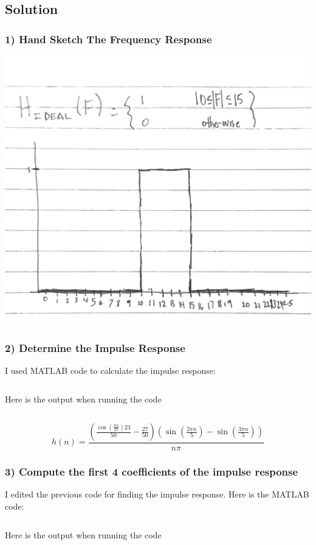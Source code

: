 \documentclass[12pt,letterpaper]{article}
\begin{document}
\subsection*{Solution}
\subsubsection*{1) Hand Sketch The Frequency Response}
\includegraphics*[scale=0.25]{p2p1.jpg}
\subsubsection*{2) Determine the Impulse Response}
I used MATLAB code to calculate the impulse response:
\inputminted[frame=lines,framesep=2mm,baselinestretch=1.2,bgcolor=LightGray,breaklines,fontsize=\tiny,linenos]{matlab}{p2p2.m}
\newpage
Here is the output when running the code
\inputminted[frame=lines,framesep=2mm,baselinestretch=1.2,bgcolor=LightGray,breaklines,fontsize=\tiny,linenos]{text}{p2p2.txt}
\[
h(n) = \frac{(\frac{\cos\left(\frac{\pi n}{25}\right) 23}{50} - \frac{27}{50}) \left(\sin\left(\frac{2 \pi n}{5}\right) - \sin\left(\frac{3 \pi n}{5}\right)\right)}{n \pi}
\]
\subsubsection*{3) Compute the first 4 coefficients of the impulse response}
I edited the previous code for finding the impulse response. Here is the MATLAB code:
\inputminted[frame=lines,framesep=2mm,baselinestretch=1.2,bgcolor=LightGray,breaklines,fontsize=\tiny,linenos]{matlab}{p2p3.m}
Here is the output when running the code
\inputminted[frame=lines,framesep=2mm,baselinestretch=1.2,bgcolor=LightGray,breaklines,fontsize=\tiny,linenos]{text}{p2p3.txt}
\end{document}
